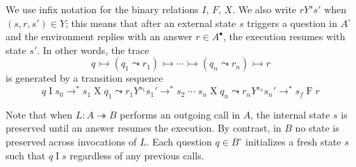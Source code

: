 \documentclass[acmsmall,screen,review,anonymous]{acmart}
\newcommand{\kw}[1]{\ensuremath{ \mathsf{#1} }}
\newcommand{\que}{\circ}
\newcommand{\ans}{\bullet}
\begin{document}
We use infix notation for the binary relations $I$, $F$, $X$.
We also write $r \mathrel{Y^s} s'$ when $(s, r, s') \in Y$;
this means that
after an external state $s$ triggers a question in $A^\que$ %
and the environment replies with an answer $r \in A^\ans$,
the execution resumes with state $s'$.
In other words,
the trace
\[
  q \rightarrowtail
  (q_1 \leadsto r_1) \rightarrowtail
  \cdots \rightarrowtail
  (q_n \leadsto r_n) \rightarrowtail
  r
\]
is generated by a transition sequence
\[
  q \mathrel{I} s_0 \rightarrow^*
  s_1 \mathrel{X} q_1 \leadsto
  r_1 \mathrel{Y^{s_1}} s_1' \rightarrow^*
  s_2 \mathrel{\cdots}
  s_n \mathrel{X} q_n \leadsto
  r_n \mathrel{Y^{s_n}} s_n' \rightarrow^*
  s_f \mathrel{F} r
\]

Note that
when $L : A \twoheadrightarrow B$
performs an outgoing call in $A$,
the internal state $s$ is preserved
until an answer resumes the execution.
By contrast, in $B$
no state is preserved across invocations of $L$.
Each question $q \in B^\que$ initializes a fresh state $s$
such that $q \mathrel{I} s$
regardless of any previous calls. %

%
\end{document}
